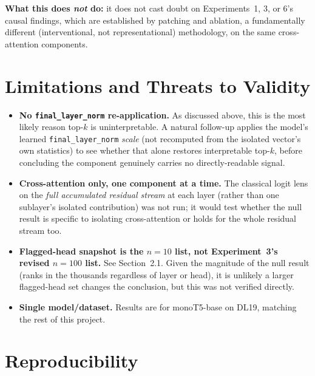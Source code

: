 \documentclass[11pt]{article}
\begin{document}
\textbf{What this does \emph{not} do:} it does not cast doubt on
Experiments~1, 3, or 6's causal findings, which are established by patching
and ablation, a fundamentally different (interventional, not
representational) methodology, on the same cross-attention components.

\section{Limitations and Threats to Validity}
\label{sec:limits}

\begin{itemize}
  \item \textbf{No \texttt{final\_layer\_norm} re-application.} As
  discussed above, this is the most likely reason top-$k$ is
  uninterpretable. A natural follow-up applies the model's learned
  \texttt{final\_layer\_norm} \emph{scale} (not recomputed from the
  isolated vector's own statistics) to see whether that alone restores
  interpretable top-$k$, before concluding the component genuinely carries
  no directly-readable signal.
  \item \textbf{Cross-attention only, one component at a time.} The
  classical logit lens on the \emph{full accumulated residual stream} at
  each layer (rather than one sublayer's isolated contribution) was not
  run; it would test whether the null result is specific to isolating
  cross-attention or holds for the whole residual stream too.
  \item \textbf{Flagged-head snapshot is the $n=10$ list, not
  Experiment~3's revised $n=100$ list.} See Section~2.1. Given the
  magnitude of the null result (ranks in the thousands regardless of
  layer or head), it is unlikely a larger flagged-head set changes the
  conclusion, but this was not verified directly.
  \item \textbf{Single model/dataset.} Results are for monoT5-base on
  DL19, matching the rest of this project.
\end{itemize}

\section{Reproducibility}
\end{document}
